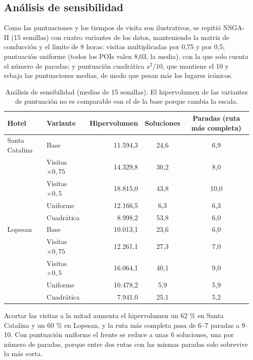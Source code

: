 \subsection{Análisis de sensibilidad}
\label{sec:sensibilidad}

Como las puntuaciones y los tiempos de visita son ilustrativos, se repitió NSGA-II (15 semillas) con cuatro variantes de los datos, manteniendo la matriz de conducción y el límite de 8 horas: visitas multiplicadas por 0,75 y por 0,5; puntuación uniforme (todos los POIs valen 8,03, la media), con la que solo cuenta el número de paradas; y puntuación cuadrática $s^2/10$, que mantiene el 10 y rebaja las puntuaciones medias, de modo que pesan más los lugares icónicos.

\begin{table}[H]
\centering
\small
\caption{Análisis de sensibilidad (medias de 15 semillas). El hipervolumen de las variantes de puntuación no es comparable con el de la base porque cambia la escala.}
\label{tab:sensibilidad}
\begin{tabular}{@{}l l r c c@{}}
\toprule
Hotel & Variante & Hipervolumen & Soluciones & Paradas (ruta más completa) \\
\midrule
Santa Catalina & Base & 11.594,3 & 24,6 & 6,9 \\
 & Visitas $\times 0{,}75$ & 14.329,8 & 30,2 & 8,0 \\
 & Visitas $\times 0{,}5$ & 18.815,0 & 43,8 & 10,0 \\
 & Uniforme & 12.166,5 & 6,3 & 6,3 \\
 & Cuadrática & 8.998,2 & 53,8 & 6,0 \\
\midrule
Lopesan & Base & 10.013,1 & 23,6 & 6,0 \\
 & Visitas $\times 0{,}75$ & 12.261,1 & 27,3 & 7,0 \\
 & Visitas $\times 0{,}5$ & 16.064,1 & 40,1 & 9,0 \\
 & Uniforme & 10.478,2 & 5,9 & 5,9 \\
 & Cuadrática & 7.941,0 & 25,1 & 5,2 \\
\bottomrule
\end{tabular}
\end{table}

Acortar las visitas a la mitad aumenta el hipervolumen un 62 \% en Santa Catalina y un 60 \% en Lopesan, y la ruta más completa pasa de 6--7 paradas a 9--10. Con puntuación uniforme el frente se reduce a unas 6 soluciones, una por número de paradas, porque entre dos rutas con las mismas paradas solo sobrevive la más corta.

